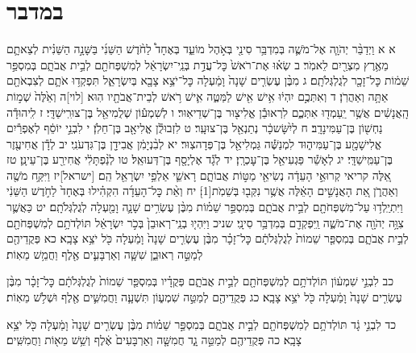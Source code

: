 \documentclass[twoside, openany, parskip=half, 11pt]{book}
\begin{document}
\chapter[במדבר]{ במדבר }

א א וַיְדַבֵּ֨ר יְהֹוָ֧ה אֶל־מֹשֶׁ֛ה בְּמִדְבַּ֥ר סִינַ֖י בְּאֹ֣הֶל מוֹעֵ֑ד בְּאֶחָד֩ לַחֹ֨דֶשׁ הַשֵּׁנִ֜י בַּשָּׁנָ֣ה הַשֵּׁנִ֗ית לְצֵאתָ֛ם מֵאֶ֥רֶץ מִצְרַ֖יִם לֵאמֹֽר׃ ב שְׂא֗וּ אֶת־רֹאשׁ֙ כׇּל־עֲדַ֣ת בְּנֵֽי־יִשְׂרָאֵ֔ל לְמִשְׁפְּחֹתָ֖ם לְבֵ֣ית אֲבֹתָ֑ם בְּמִסְפַּ֣ר שֵׁמ֔וֹת כׇּל־זָכָ֖ר לְגֻלְגְּלֹתָֽם׃ ג מִבֶּ֨ן עֶשְׂרִ֤ים שָׁנָה֙ וָמַ֔עְלָה כׇּל־יֹצֵ֥א צָבָ֖א בְּיִשְׂרָאֵ֑ל תִּפְקְד֥וּ אֹתָ֛ם לְצִבְאֹתָ֖ם אַתָּ֥ה וְאַהֲרֹֽן׃ ד וְאִתְּכֶ֣ם יִהְי֔וּ אִ֥ישׁ אִ֖ישׁ לַמַּטֶּ֑ה אִ֛ישׁ רֹ֥אשׁ לְבֵית־אֲבֹתָ֖יו הֽוּא׃ [לוי]ה וְאֵ֙לֶּה֙ שְׁמ֣וֹת הָֽאֲנָשִׁ֔ים אֲשֶׁ֥ר יַֽעַמְד֖וּ אִתְּכֶ֑ם לִרְאוּבֵ֕ן אֱלִיצ֖וּר בֶּן־שְׁדֵיאֽוּר׃ ו לְשִׁמְע֕וֹן שְׁלֻמִיאֵ֖ל בֶּן־צוּרִֽישַׁדָּֽי׃ ז לִֽיהוּדָ֕ה נַחְשׁ֖וֹן בֶּן־עַמִּינָדָֽב׃ ח לְיִ֨שָּׂשכָ֔ר נְתַנְאֵ֖ל בֶּן־צוּעָֽר׃ ט לִזְבוּלֻ֕ן אֱלִיאָ֖ב בֶּן־חֵלֹֽן׃ י לִבְנֵ֣י יוֹסֵ֔ף לְאֶפְרַ֕יִם אֱלִישָׁמָ֖ע בֶּן־עַמִּיה֑וּד לִמְנַשֶּׁ֕ה גַּמְלִיאֵ֖ל בֶּן־פְּדָהצֽוּר׃ יא לְבִ֨נְיָמִ֔ן אֲבִידָ֖ן בֶּן־גִּדְעֹנִֽי׃ יב לְדָ֕ן אֲחִיעֶ֖זֶר בֶּן־עַמִּֽישַׁדָּֽי׃ יג לְאָשֵׁ֕ר פַּגְעִיאֵ֖ל בֶּן־עׇכְרָֽן׃ יד לְגָ֕ד אֶלְיָסָ֖ף בֶּן־דְּעוּאֵֽל׃ טו לְנַ֨פְתָּלִ֔י אֲחִירַ֖ע בֶּן־עֵינָֽן׃ טז אֵ֚לֶּה קריאי קְרוּאֵ֣י הָעֵדָ֔ה נְשִׂיאֵ֖י מַטּ֣וֹת אֲבוֹתָ֑ם רָאשֵׁ֛י אַלְפֵ֥י יִשְׂרָאֵ֖ל הֵֽם׃ [ישראל]יז וַיִּקַּ֥ח מֹשֶׁ֖ה וְאַהֲרֹ֑ן אֵ֚ת הָאֲנָשִׁ֣ים הָאֵ֔לֶּה אֲשֶׁ֥ר נִקְּב֖וּ בְּשֵׁמֹֽת‏[1]׃ יח וְאֵ֨ת כׇּל־הָעֵדָ֜ה הִקְהִ֗ילוּ בְּאֶחָד֙ לַחֹ֣דֶשׁ הַשֵּׁנִ֔י וַיִּתְיַֽלְד֥וּ עַל־מִשְׁפְּחֹתָ֖ם לְבֵ֣ית אֲבֹתָ֑ם בְּמִסְפַּ֣ר שֵׁמ֗וֹת מִבֶּ֨ן עֶשְׂרִ֥ים שָׁנָ֛ה וָמַ֖עְלָה לְגֻלְגְּלֹתָֽם׃ יט כַּאֲשֶׁ֛ר צִוָּ֥ה יְהֹוָ֖ה אֶת־מֹשֶׁ֑ה וַֽיִּפְקְדֵ֖ם בְּמִדְבַּ֥ר סִינָֽי׃
שניכ וַיִּהְי֤וּ בְנֵֽי־רְאוּבֵן֙ בְּכֹ֣ר יִשְׂרָאֵ֔ל תּוֹלְדֹתָ֥ם לְמִשְׁפְּחֹתָ֖ם לְבֵ֣ית אֲבֹתָ֑ם בְּמִסְפַּ֤ר שֵׁמוֹת֙ לְגֻלְגְּלֹתָ֔ם כׇּל־זָכָ֗ר מִבֶּ֨ן עֶשְׂרִ֤ים שָׁנָה֙ וָמַ֔עְלָה כֹּ֖ל יֹצֵ֥א צָבָֽא׃ כא פְּקֻדֵיהֶ֖ם לְמַטֵּ֣ה רְאוּבֵ֑ן שִׁשָּׁ֧ה וְאַרְבָּעִ֛ים אֶ֖לֶף וַחֲמֵ֥שׁ מֵאֽוֹת׃

כב לִבְנֵ֣י שִׁמְע֔וֹן תּוֹלְדֹתָ֥ם לְמִשְׁפְּחֹתָ֖ם לְבֵ֣ית אֲבֹתָ֑ם פְּקֻדָ֗יו בְּמִסְפַּ֤ר שֵׁמוֹת֙ לְגֻלְגְּלֹתָ֔ם כׇּל־זָכָ֗ר מִבֶּ֨ן עֶשְׂרִ֤ים שָׁנָה֙ וָמַ֔עְלָה כֹּ֖ל יֹצֵ֥א צָבָֽא׃ כג פְּקֻדֵיהֶ֖ם לְמַטֵּ֣ה שִׁמְע֑וֹן תִּשְׁעָ֧ה וַחֲמִשִּׁ֛ים אֶ֖לֶף וּשְׁלֹ֥שׁ מֵאֽוֹת׃

כד לִבְנֵ֣י גָ֔ד תּוֹלְדֹתָ֥ם לְמִשְׁפְּחֹתָ֖ם לְבֵ֣ית אֲבֹתָ֑ם בְּמִסְפַּ֣ר שֵׁמ֗וֹת מִבֶּ֨ן עֶשְׂרִ֤ים שָׁנָה֙ וָמַ֔עְלָה כֹּ֖ל יֹצֵ֥א צָבָֽא׃ כה פְּקֻדֵיהֶ֖ם לְמַטֵּ֣ה גָ֑ד חֲמִשָּׁ֤ה וְאַרְבָּעִים֙ אֶ֔לֶף וְשֵׁ֥שׁ מֵא֖וֹת וַחֲמִשִּֽׁים׃
\end{document}
